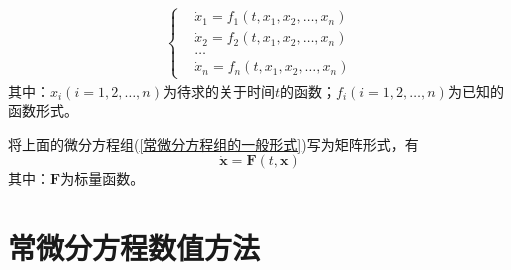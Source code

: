 	\begin{align}
		\label{常微分方程组的一般形式}
		\left\{
			\begin{aligned}
			&\dot{x}_1 = f_1({t,x_1,x_2,\dots,x_n})\\
			&\dot{x}_2 = f_2({t,x_1,x_2,\dots,x_n})\\
			&\dots\\
			&\dot{x}_n = f_n({t,x_1,x_2,\dots,x_n})
			\end{aligned}
		\right.
	\end{align}
	其中：$x_i(i=1,2,\dots,n)$为待求的关于时间$t$的函数；$f_i(i=1,2,\dots,n)$为已知的函数形式。
	\par
	将上面的微分方程组(\ref{常微分方程组的一般形式})写为矩阵形式，有
	\[
		\dot{\mathbf x}=\mathbf F(t,\mathbf x)
	\]
	其中：$\mathbf F$为标量函数。

\section{常微分方程数值方法}
